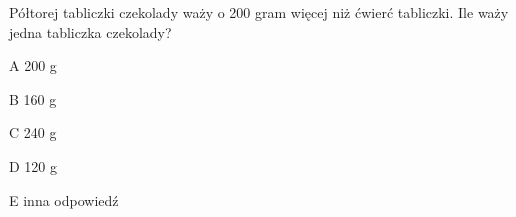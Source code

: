 \begin{tresc}
Półtorej tabliczki czekolady waży o 200 gram więcej niż ćwierć tabliczki. Ile waży jedna tabliczka czekolady?
\end{tresc}
\begin{wariant}{A} 200 g \end{wariant}
\begin{wariant}{B} 160 g \end{wariant}
\begin{wariant}{C} 240 g \end{wariant}
\begin{wariant}{D} 120 g \end{wariant}
\begin{wariant}{E} inna odpowiedź \end{wariant}
